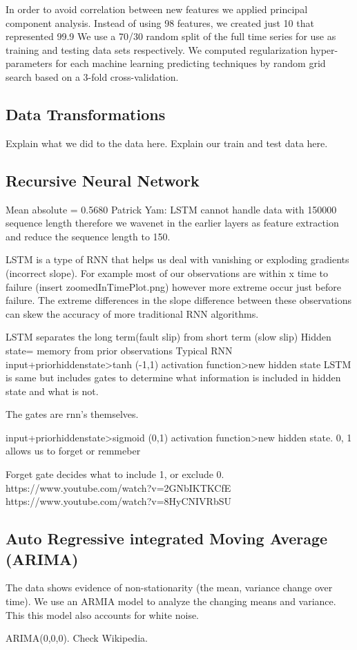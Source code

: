 \documentclass[]{llncs}
\begin{document}
In order to avoid correlation between new features we applied principal component analysis.  Instead of using 98 features, we created just 10 that represented 99.9%
We use a 70/30 random split of the full time series for use as training and testing data sets respectively. We computed regularization hyper-parameters for each machine learning predicting techniques by random grid search based on a 3-fold cross-validation.
\subsection{Data Transformations}
Explain what we did to the data here.
Explain our train and test data here.

\subsection{Recursive Neural Network}
Mean absolute = 0.5680
Patrick Yam: LSTM cannot handle data with 150000 sequence length therefore we wavenet in the earlier layers as feature extraction and reduce the sequence length to 150.\par

LSTM is a type of RNN that helps us deal with vanishing or exploding gradients (incorrect slope). For example most of our observations are within x time to failure (insert zoomedInTimePlot.png) however more extreme occur just before failure. The extreme differences in the slope difference between these observations can skew the accuracy of more traditional RNN algorithms.

LSTM separates the long term(fault slip) from short term (slow slip)
Hidden state= memory from prior observations
Typical RNN input+priorhiddenstate>tanh (-1,1) activation function>new hidden state
LSTM is same but includes gates to determine what information is included in hidden state and what is not.

The gates are rnn's themselves.

input+priorhiddenstate>sigmoid (0,1) activation function>new hidden state. 0, 1 allows us to forget or remmeber 

Forget gate decides what to include 1, or exclude 0. 
https://www.youtube.com/watch?v=2GNbIKTKCfE
https://www.youtube.com/watch?v=8HyCNIVRbSU

\subsection{Auto Regressive integrated Moving Average (ARIMA)}
The data shows evidence of non-stationarity (the mean, variance change over time). We use an ARMIA model to analyze the changing means and variance. This this model also accounts for white noise.\par ARIMA(0,0,0). Check Wikipedia.
\end{document}
